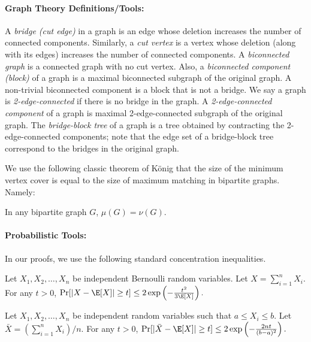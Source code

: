 \paragraph{Graph Theory Definitions/Tools:} A {\em bridge (cut edge)} in a graph is an edge whose deletion increases the number of connected components. Similarly, a {\em cut vertex} is a vertex whose deletion (along with its edges)  increases the number of connected components. A {\em biconnected graph} is a connected graph with no cut vertex. Also, a {\em biconnected component (block)} of a graph is a maximal biconnected subgraph of the original graph. A non-trivial biconnected component is a block that is not a bridge. We say a graph is {\em 2-edge-connected} if there is no bridge in the graph. A {\em 2-edge-connected component} of a graph is maximal 2-edge-connected subgraph of the original graph. The {\em bridge-block tree} of a graph is a tree obtained by contracting the 2-edge-connected components; note that the edge set of a bridge-block tree correspond to the bridges in the original graph.


We use the following classic theorem of K\"{o}nig \cite{Konig1916} that the size of the minimum vertex cover is equal to the size of maximum matching in bipartite graphs. Namely:

\begin{proposition}\label{prop:konig}
    In any bipartite graph $G$,  $\mu(G) = \nu(G)$.
\end{proposition}


\paragraph{Probabilistic Tools:} In our proofs, we use the following standard concentration inequalities.

\begin{proposition}\label{prop:chernoff}
    Let $X_1, X_2, \ldots, X_n$ be independent Bernoulli random variables. Let $X = \sum_{i=1}^{n} X_i$. For any $t > 0$, 
    $\Pr[|X - \E[X]| \geq t] \leq 2\exp\left(-\frac{t^2}{3\E[X]}\right).$
\end{proposition}

\begin{proposition}\label{prop:hoeffding}
    Let $X_1, X_2, \ldots, X_n$ be independent random variables such that $a \leq X_i \leq b$. Let $\bar{X} = (\sum_{i=1}^n X_i)/n$. For any $t > 0$, 
    $
    \Pr[|\bar{X} - \E[X]| \geq t] \leq 2\exp\left(-\frac{2nt}{(b-a)^2}\right).
    $
\end{proposition}



